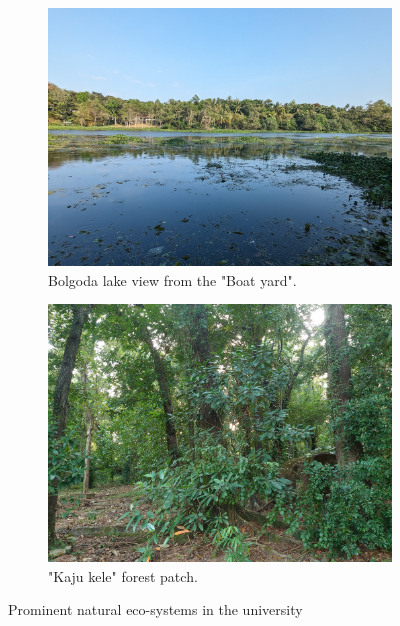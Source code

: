 \begin{figure}[!htpb]
    \centering
    \begin{subfigure}{0.45\textwidth}
        \includegraphics[width=\textwidth]{Figures/bolgoda.jpg}
        \caption{Bolgoda lake view from the "Boat yard".}
        \label{fig:figure-02.1}
    \end{subfigure}
    \hspace{.5cm} %
    \begin{subfigure}{0.45\textwidth}
        \includegraphics[width=\textwidth]{Figures/kajuKele.jpg}
        \caption{"Kaju kele" forest patch.}
        \label{fig:figure-02.2}
    \end{subfigure}
    \caption{Prominent natural eco-systems in the university}
    \label{fig:figure-02}
\end{figure}

